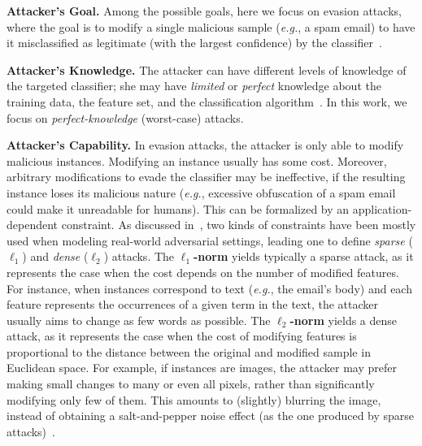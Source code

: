 \documentclass[runningheads,a4paper]{llncs}
\newcommand{\eg}{\emph{e.g.}}
\newcommand{\myparagraph}[1]{\smallskip \noindent \textbf{#1.}}
\begin{document}
\myparagraph{Attacker's Goal}
Among the possible goals, here we focus on evasion attacks, where the goal is to modify a single malicious sample (\eg, a spam email) to have it misclassified as legitimate (with the largest confidence) by the classifier~\cite{biggio13-ecml}.


\myparagraph{Attacker's Knowledge}
The attacker can have different levels of knowledge of the targeted classifier; she may  have \emph{limited} or \emph{perfect} knowledge about the training data, the feature set, and the classification algorithm~\cite{biggio13-ecml,biggio14-tkde}.
In this work, we focus on \emph{perfect-knowledge} (worst-case) attacks.

\myparagraph{Attacker's Capability}
In evasion attacks, the attacker is only able to modify malicious instances.
Modifying an instance usually has some cost. Moreover, arbitrary modifications to evade the classifier may be ineffective, if the resulting instance loses its malicious nature (\eg, excessive obfuscation of a spam email could make it unreadable for humans).
This can be formalized by an application-dependent constraint. 
As discussed in~\cite{wang14-icdm}, two kinds of constraints have been mostly used when modeling real-world adversarial settings, leading one to define \emph{sparse} ($\ell_{1}$) and \emph{dense} ($\ell_{2}$) attacks.
The \textbf{$\ell_{1}$-norm} yields typically a sparse attack, as it represents the case when the cost depends on the number of modified features. For instance, when instances correspond to text (\eg, the email's body) and each feature represents the occurrences of a given term in the text, the attacker usually aims to change as few words as possible.
The \textbf{$\ell_{2}$-norm} yields a dense attack, as it represents the case when the cost of modifying features is proportional to the distance between the original and modified sample in Euclidean space. For example, if instances are images, the attacker may prefer making small changes to many or even all pixels, rather than significantly modifying only few of them. This amounts to (slightly) blurring the image, instead of obtaining a salt-and-pepper noise effect (as the one produced by sparse attacks)~\cite{wang14-icdm}.
\end{document}
